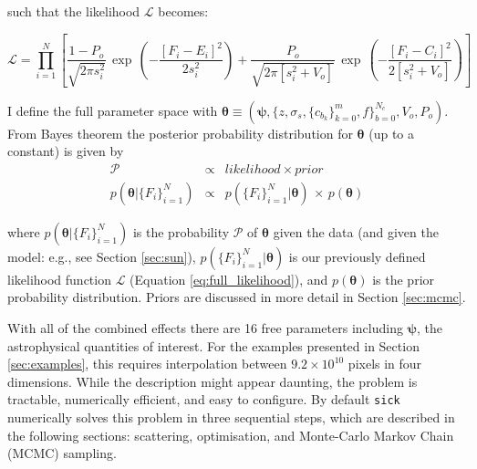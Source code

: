 \documentclass[iop]{emulateapj}
\newcommand{\sick}{\texttt{sick}}
\begin{document}
\noindent{}such that the likelihood $\mathcal{L}$ becomes:

\begin{equation}
\mathcal{L} = \prod_{i=1}^{N} \left[ \frac{1-P_o}{\sqrt{2\pi{}s_{i}^2}}\,\exp\,\left(-\frac{[F_i - E_i]^2}{2s_{i}^{2}}\right) + \frac{P_o}{\sqrt{2\pi\left[s_{i}^2 + V_o\right]}}\,\exp\,\left(-\frac{[F_i - C_i]^2}{2\left[s_{i}^{2} + V_o\right]}\right)\right]
\label{eq:full_likelihood}
\end{equation}

I define the full parameter space with $\bm{\theta} \equiv \left(\bm{\psi},\{z,\sigma_s,\{c_{b_k}\}_{k=0}^{m},f\}_{b=0}^{N_{c}},V_o,P_o\right)$. From Bayes theorem the posterior probability 
distribution for $\bm{\theta}$ (up to a constant) is given by
\begin{eqnarray}
\mathcal{P} & \propto & likelihood \times prior \nonumber \\
p(\bm{\theta}|\{F_i\}_{i=1}^{N}) & \propto & p(\{F_i\}_{i=1}^{N}|\bm{\theta})\,\times\,p(\bm{\theta})
\label{eq:probability}
\end{eqnarray}

\noindent{}where $p(\bm{\theta}|\{F_i\}_{i=1}^{N})$ is the probability $\mathcal{P}$ 
of $\bm{\theta}$ given the data (and given the model: e.g., see Section \ref{sec:sun}), 
$p(\{F_i\}_{i=1}^{N}|\bm{\theta})$ is our previously defined likelihood function 
$\mathcal{L}$ (Equation \ref{eq:full_likelihood}), and $p(\bm{\theta})$ is the prior 
probability distribution. Priors are discussed in more detail in Section \ref{sec:mcmc}. 


With all of the combined effects there are 16 free parameters including $\bm{\psi}$, 
the astrophysical quantities of interest. For the examples presented in Section 
\ref{sec:examples}, this requires interpolation between $9.2 \times 10^{10}$ pixels in four 
dimensions. While the description might appear daunting, the problem is tractable, 
numerically efficient, and easy to configure. By default \sick{} numerically solves 
this problem in three sequential steps, which are described in the following 
sections: scattering, optimisation, and Monte-Carlo Markov Chain (MCMC) sampling.
\end{document}
